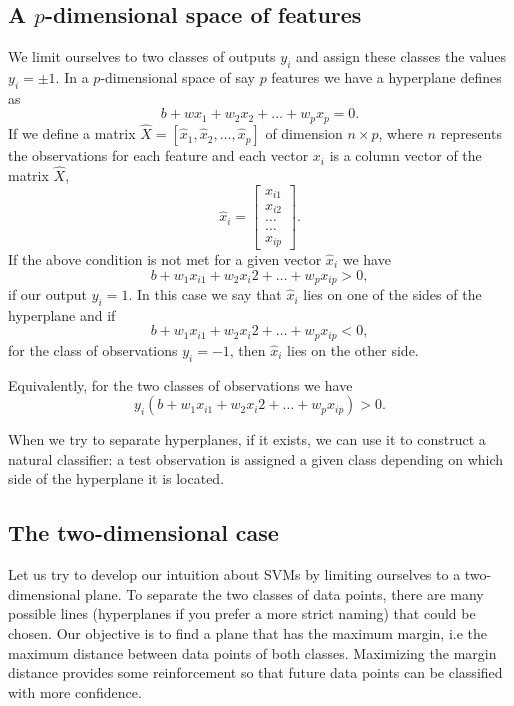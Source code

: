\documentclass[%
oneside,                 %
final,                   %
10pt]{article}
\begin{document}
\subsection*{A $p$-dimensional space of features}

We limit ourselves to two classes of outputs $y_i$ and assign these classes the values $y_i = \pm 1$. 
In a $p$-dimensional space of say $p$ features we have a hyperplane defines as 
\[
b+wx_1+w_2x_2+\dots +w_px_p=0.
\]
If we define a 
matrix $\hat{X}=\left[\hat{x}_1,\hat{x}_2,\dots, \hat{x}_p\right]$
of dimension $n\times p$, where $n$ represents the observations for each feature and each vector $x_i$ is a column vector of the matrix $\hat{X}$, 
\[
\hat{x}_i = \begin{bmatrix} x_{i1} \\ x_{i2} \\ \dots \\ \dots \\ x_{ip} \end{bmatrix}.
\]
If the above condition is not met for a given vector $\hat{x}_i$ we have 
\[
b+w_1x_{i1}+w_2x_{i}2+\dots +w_px_{ip} >0,
\]
if our output $y_i=1$.
In this case we say that $\hat{x}_i$ lies on one of the sides of the hyperplane and if 
\[
b+w_1x_{i1}+w_2x_{i}2+\dots +w_px_{ip} < 0,
\]
for the class of observations $y_i=-1$, 
then $\hat{x}_i$ lies on the other side. 

Equivalently, for the two classes of observations we have 
\[
y_i\left(b+w_1x_{i1}+w_2x_{i}2+\dots +w_px_{ip}\right) > 0. 
\]

When we try to separate hyperplanes, if it exists, we can use it to construct a natural classifier: a test observation is assigned a given class depending on which side of the hyperplane it is located.

\subsection*{The two-dimensional case}

Let us try to develop our intuition about SVMs by limiting ourselves to a two-dimensional
plane.  To separate the two classes of data points, there are many
possible lines (hyperplanes if you prefer a more strict naming)  
that could be chosen. Our objective is to find a
plane that has the maximum margin, i.e the maximum distance between
data points of both classes. Maximizing the margin distance provides
some reinforcement so that future data points can be classified with
more confidence.
\end{document}
